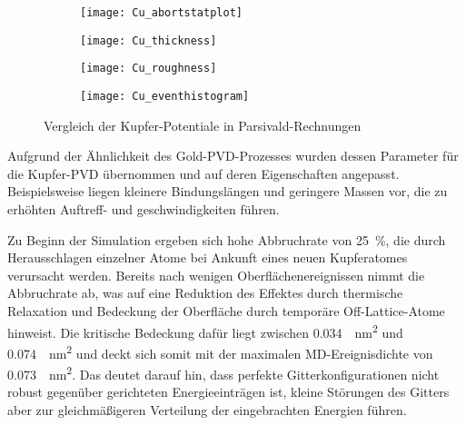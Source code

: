 \begin{figure}[hp]
  \captionsetup[subfigure]{singlelinecheck=false}
  \def\subfigwidth{0.49\textwidth}
  \begin{subfigure}[t]{\subfigwidth}
    \texttt{[image: Cu\_abortstatplot]}
    \label{fig:copperparsivald-a}
  \end{subfigure}
  \hfill
  \begin{subfigure}[t]{\subfigwidth}
    \texttt{[image: Cu\_thickness]}
    \label{fig:copperparsivald-b}
  \end{subfigure}
  \begin{subfigure}[t]{\subfigwidth}
    \texttt{[image: Cu\_roughness]}
    \label{fig:copperparsivald-c}
  \end{subfigure}
  \hfill
  \begin{subfigure}[t]{\subfigwidth}
    \texttt{[image: Cu\_eventhistogram]}
    \label{fig:copperparsivald-d}
  \end{subfigure}
  \caption{Vergleich der Kupfer-Potentiale in Parsivald-Rechnungen}
  \label{fig:copperparsivald}
\end{figure}

Aufgrund der Ähnlichkeit des Gold-PVD-Prozesses wurden dessen Parameter für die Kupfer-PVD übernommen und auf deren Eigenschaften angepasst.
Beispielsweise liegen kleinere Bindungslängen und geringere Massen vor, die zu erhöhten Auftreff- und geschwindigkeiten führen.

Zu Beginn der Simulation ergeben sich hohe Abbruchrate von \SI{25}{\percent}, die durch Herausschlagen einzelner Atome bei Ankunft eines neuen Kupferatomes verursacht werden.
Bereits nach wenigen Oberflächenereignissen nimmt die Abbruchrate ab, was auf eine Reduktion des Effektes durch thermische Relaxation und Bedeckung der Oberfläche durch temporäre Off-Lattice-Atome hinweist.
Die kritische Bedeckung dafür liegt zwischen \SI{0.034}{\per\nano\meter\squared} und \SI{0.074}{\per\nano\meter\squared} und deckt sich somit mit der maximalen MD-Ereignisdichte von \SI{0.073}{\per\nano\meter\squared}.
Das deutet darauf hin, dass perfekte Gitterkonfigurationen nicht robust gegenüber gerichteten Energieeinträgen ist, kleine Störungen des Gitters aber zur gleichmäßigeren Verteilung der eingebrachten Energien führen.

